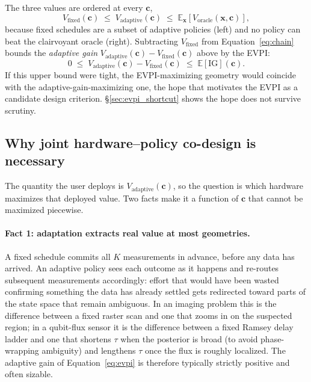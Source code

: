 \documentclass[11pt,a4paper,onecolumn]{article}
\newcommand{\E}{\mathbb{E}}
\newcommand{\bx}{\bm{x}}
\newcommand{\bc}{\bm{c}}
\begin{document}
The three values are ordered at every $\bc$,
\begin{equation}
V_{\text{fixed}}(\bc) \;\le\; V_{\text{adaptive}}(\bc) \;\le\; \E_{\bx}[V_{\text{oracle}}(\bx, \bc)],
\label{eq:chain}
\end{equation}
because fixed schedules are a subset of adaptive policies (left) and no policy can beat the clairvoyant oracle (right).  Subtracting $V_{\text{fixed}}$ from Equation~\eqref{eq:chain} bounds the \emph{adaptive gain} $V_{\text{adaptive}}(\bc) - V_{\text{fixed}}(\bc)$ above by the EVPI:
\begin{equation}
0 \;\le\; V_{\text{adaptive}}(\bc) - V_{\text{fixed}}(\bc) \;\le\; \E[\mathrm{IG}](\bc).
\label{eq:evpi}
\end{equation}
If this upper bound were tight, the EVPI-maximizing geometry would coincide with the adaptive-gain-maximizing one, the hope that motivates the EVPI as a candidate design criterion.  §\ref{sec:evpi_shortcut} shows the hope does not survive scrutiny.

\subsection{Why joint hardware--policy co-design is necessary}
\label{sec:codesign_case}

The quantity the user deploys is $V_{\text{adaptive}}(\bc)$, so the question is which hardware maximizes that deployed value.  Two facts make it a function of $\bc$ that cannot be maximized piecewise.

\paragraph{Fact 1: adaptation extracts real value at most geometries.}  A fixed schedule commits all $K$ measurements in advance, before any data has arrived.  An adaptive policy sees each outcome as it happens and re-routes subsequent measurements accordingly: effort that would have been wasted confirming something the data has already settled gets redirected toward parts of the state space that remain ambiguous.  In an imaging problem this is the difference between a fixed raster scan and one that zooms in on the suspected region; in a qubit-flux sensor it is the difference between a fixed Ramsey delay ladder and one that shortens $\tau$ when the posterior is broad (to avoid phase-wrapping ambiguity) and lengthens $\tau$ once the flux is roughly localized.  The adaptive gain of Equation~\eqref{eq:evpi} is therefore typically strictly positive and often sizable.
\end{document}
